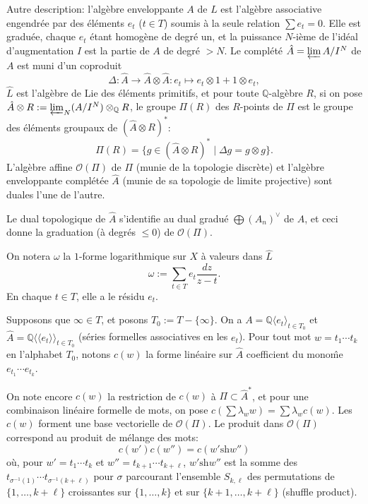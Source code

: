 \documentclass[11pt,a4paper]{article}
\theoremstyle{plain}
\theoremstyle{definition}
\newcommand{\Q}{\mathbb{Q}}
\newcommand{\shuffle}{{\text{sh}}}
\begin{document}
Autre description: l'alg\`ebre enveloppante $A$ de $L$ est l'alg\`ebre associative engendr\'ee par des \'el\'ements $e_t$ ($t \in T$) soumis \`a la seule relation $\sum e_t = 0$. Elle est gradu\'ee, chaque $e_t$ \'etant homog\`ene de degr\'e un, et la puissance $N$-i\`eme de l'id\'eal d'augmentation $I$ est la partie de $A$ de degr\'e $> N$. Le compl\'et\'e $\hat{A} = \varprojlim A/I^N$ de $A$ est muni d'un coproduit
\[
\Delta : \hat{A} \to \hat{A} \otimes \hat{A} : e_t \mapsto e_t \otimes 1 + 1 \otimes e_t,
\]
$\hat{L}$ est l'alg\`ebre de Lie des \'el\'ements primitifs, et pour toute $\Q$-alg\`ebre $R$, si on pose $\hat{A} \otimes R := \varprojlim_N (A/I^N) \otimes_{\Q} R$, le groupe $\Pi(R)$ des $R$-points de $\Pi$ est le groupe des \'el\'ements groupaux de $(\hat{A} \otimes R)^*$:
\begin{equation}\label{eq:3.1.3}
\Pi(R) = \{g \in (\hat{A} \otimes R)^* \mid \Delta g = g \otimes g\}.
\end{equation}
L'alg\`ebre affine $\mathcal{O}(\Pi)$ de $\Pi$ (munie de la topologie discr\`ete) et l'alg\`ebre enveloppante compl\'et\'ee $\hat{A}$ (munie de sa topologie de limite projective) sont duales l'une de l'autre.

Le dual topologique de $\hat{A}$ s'identifie au dual gradu\'e $\bigoplus (A_n)^\vee$ de $A$, et ceci donne la graduation (\`a degr\'es $\leq 0$) de $\mathcal{O}(\Pi)$.

On notera $\omega$ la $1$-forme logarithmique sur $X$ \`a valeurs dans $\hat{L}$
\begin{equation}\label{eq:3.1.4}
\omega := \sum_{t \in T} e_t \frac{dz}{z-t}.
\end{equation}
En chaque $t \in T$, elle a le r\'esidu $e_t$.

Supposons que $\infty \in T$, et posons $T_0 := T - \{\infty\}$. On a $A = \Q\langle e_t \rangle_{t \in T_0}$ et $\hat{A} = \Q\langle\langle e_t \rangle\rangle_{t \in T_0}$ (s\'eries formelles associatives en les $e_t$). Pour tout mot $w = t_1 \cdots t_k$ en l'alphabet $T_0$, notons $c(w)$ la forme lin\'eaire sur $\hat{A}$ coefficient du mono\^me $e_{t_1} \cdots e_{t_k}$.

On note encore $c(w)$ la restriction de $c(w)$ \`a $\Pi \subset \hat{A}^*$, et pour une combinaison lin\'eaire formelle de mots, on pose $c(\sum \lambda_w w) = \sum \lambda_w c(w)$. Les $c(w)$ forment une base vectorielle de $\mathcal{O}(\Pi)$. Le produit dans $\mathcal{O}(\Pi)$ correspond au produit de m\'elange des mots:
\begin{equation}\label{eq:3.1.5}
c(w')c(w'') = c(w' \shuffle w'')
\end{equation}
o\`u, pour $w' = t_1 \cdots t_k$ et $w'' = t_{k+1} \cdots t_{k+\ell}$, $w' \shuffle w''$ est la somme des $t_{\sigma^{-1}(1)} \cdots t_{\sigma^{-1}(k+\ell)}$ pour $\sigma$ parcourant l'ensemble $S_{k,\ell}$ des permutations de $\{1,\ldots,k+\ell\}$ croissantes sur $\{1,\ldots,k\}$ et sur $\{k+1,\ldots,k+\ell\}$ (shuffle product).
\end{document}
